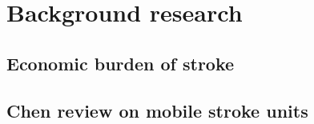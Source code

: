 \section{Background research}

\subsection{Economic burden of stroke}

\subsection{Chen review on mobile stroke units \cite{chen_systematic_2022}}